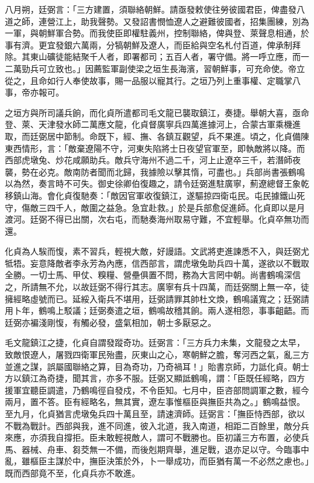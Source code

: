 \begin{pinyinscope}
八月朔，廷弼言：「三方建置，須聯絡朝鮮。請亟發敕使往勞彼國君臣，俾盡發八道之師，連營江上，助我聲勢。又發詔書憫恤遼人之避難彼國者，招集團練，別為一軍，與朝鮮軍合勢。而我使臣即權駐義州，控制聯絡，俾與登、萊聲息相通，於事有濟。更宜發銀六萬兩，分犒朝鮮及遼人，而臣給與空名札付百道，俾承制拜除。其東山礦徒能結聚千人者，即署都司；五百人者，署守備。將一呼立應，而一二萬勁兵可立致也。」因薦監軍副使梁之垣生長海濱，習朝鮮事，可充命使。帝立從之，且命如行人奉使故事，賜一品服以寵其行。之垣乃列上重事權、定職掌八事，帝亦報可。

之垣方與所司議兵餉，而化貞所遣都司毛文龍已襲取鎮江，奏捷。舉朝大喜，亟命登、萊、天津發水師二萬應文龍，化貞督廣寧兵四萬進據河上，合蒙古軍乘機進取，而廷弼居中節制。命既下，經、撫、各鎮互觀望，兵不果進。頃之，化貞備陳東西情形，言：「敵棄遼陽不守，河東失陷將士日夜望官軍至，即執敵將以降。而西部虎墩兔、炒花咸願助兵。敵兵守海州不過二千，河上止遼卒三千，若潛師夜襲，勢在必克。敵南防者聞而北歸，我據險以擊其惰，可盡也。」兵部尚書張鶴鳴以為然，奏言時不可失。御史徐卿伯復趣之，請令廷弼進駐廣寧，薊遼總督王象乾移鎮山海。會化貞復馳奏：「敵因官軍收復鎮江，遂驅掠四衛屯民。屯民據鐵山死守，傷敵三四千人，敵圍之益急。急宜赴救。」於是兵部愈促進師。化貞即以是月渡河。廷弼不得已出關，次右屯，而馳奏海州取易守難，不宜輕舉。化貞卒無功而還。

化貞為人騃而愎，素不習兵，輕視大敵，好謾語。文武將吏進諫悉不入，與廷弼尤牴牾。妄意降敵者李永芳為內應，信西部言，謂虎墩兔助兵四十萬，遂欲以不戰取全勝。一切士馬、甲仗、糗糧、營壘俱置不問，務為大言罔中朝。尚書鶴鳴深信之，所請無不允，以故廷弼不得行其志。廣寧有兵十四萬，而廷弼關上無一卒，徒擁經略虛號而已。延綏入衛兵不堪用，廷弼請罪其帥杜文煥，鶴鳴議寬之；廷弼請用卜年，鶴鳴上駁議；廷弼奏遣之垣，鶴鳴故稽其餉。兩人遂相怨，事事齟齬。而廷弼亦褊淺剛愎，有觸必發，盛氣相加，朝士多厭惡之。

毛文龍鎮江之捷，化貞自謂發蹤奇功。廷弼言：「三方兵力未集，文龍發之太早，致敵恨遼人，屠戮四衛軍民殆盡，灰東山之心，寒朝鮮之膽，奪河西之氣，亂三方並進之謀，誤屬國聯絡之算，目為奇功，乃奇禍耳！」貽書京師，力詆化貞。朝士方以鎮江為奇捷，聞其言，亦多不服。廷弼又顯詆鶴鳴，謂：「臣既任經略，四方援軍宜聽臣調遣，乃鶴鳴徑自發戍，不令臣知。七月中，臣咨部問調軍之數，經今兩月，置不答。臣有經略名，無其實，遼左事惟樞臣與撫臣共為之。」鶴鳴益恨。至九月，化貞猶言虎墩兔兵四十萬且至，請速濟師。廷弼言：「撫臣恃西部，欲以不戰為戰計。西部與我，進不同進，彼入北道，我入南道，相距二百餘里，敵分兵來應，亦須我自撐拒。臣未敢輕視敵人，謂可不戰勝也。臣初議三方布置，必使兵馬、器械、舟車、芻茭無一不備，而後剋期齊舉，進足戰，退亦足以守。今臨事中亂，雖樞臣主謀於中，撫臣決策於外，卜一舉成功，而臣猶有萬一不必然之慮也。」既而西部竟不至，化貞兵亦不敢進。


\end{pinyinscope}

